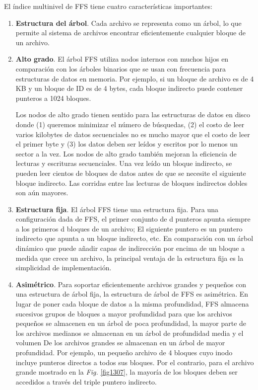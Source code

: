 \documentclass[10pt]{book}
\begin{document}
El índice multinivel de FFS tiene cuatro características importantes:
\begin{enumerate}
\item \textbf{Estructura del árbol}. Cada archivo se representa como un árbol, lo que permite al sistema de archivos encontrar eficientemente cualquier bloque de un archivo.
\item \textbf{Alto grado}. El árbol FFS utiliza nodos internos con muchos hijos en comparación con los árboles binarios que se usan con frecuencia para estructuras de datos en memoria. Por ejemplo, si un bloque de archivo es de 4 KB y un bloque de ID es de 4 bytes, cada bloque indirecto puede contener punteros a 1024 bloques.

Los nodos de alto grado tienen sentido para las estructuras de datos en disco donde (1) queremos minimizar el número de búsquedas, (2) el costo de leer varios kilobytes de datos secuenciales no es mucho mayor que el costo de leer el primer byte y (3) los datos deben ser leídos y escritos por lo menos un sector a la vez. Los nodos de alto grado también mejoran la eficiencia de lecturas y escrituras secuenciales. Una vez leído un bloque indirecto, se pueden leer cientos de bloques de datos antes de que se necesite el siguiente bloque indirecto. Las corridas entre las lecturas de bloques indirectos dobles son aún mayores.

\item \textbf{Estructura fija}. El árbol FFS tiene una estructura fija. Para una configuración dada de FFS, el primer conjunto de {\mf d} punteros apunta siempre a los primeros {\mf d} bloques de un archivo; El siguiente puntero es un puntero indirecto que apunta a un bloque indirecto, etc. En comparación con un árbol dinámico que puede añadir capas de indirección por encima de un bloque a medida que crece un archivo, la principal ventaja de la estructura fija es la simplicidad de implementación.

\item \textbf{Asimétrico}. Para soportar eficientemente archivos grandes y pequeños con una estructura de árbol fija, la estructura de árbol de FFS es asimétrica. En lugar de poner cada bloque de datos a la misma profundidad, FFS almacena sucesivos grupos de bloques a mayor profundidad para que los archivos pequeños se almacenen en un árbol de poca profundidad, la mayor parte de los archivos medianos se almacenan en un árbol de profundidad media y el volumen De los archivos grandes se almacenan en un árbol de mayor profundidad. Por ejemplo, un pequeño archivo de 4 bloques cuyo inodo incluye punteros directos a todos sus bloques. Por el contrario, para el archivo grande mostrado en la \textit{Fig.} \ref{fig1307}, la mayoría de los bloques deben ser accedidos a través del triple puntero indirecto.


\end{enumerate}
\end{document}
